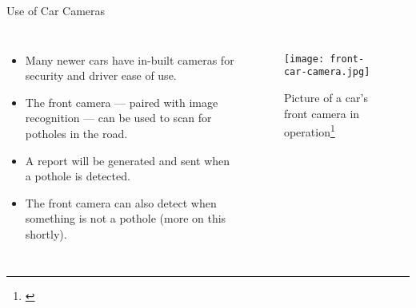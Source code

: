 \documentclass{beamer}
\begin{document}
\begin{frame}{Use of Car Cameras}
    \begin{columns}

        \begin{itemize}
            \item Many newer cars have in-built cameras for security and driver ease of use.
            \item The front camera --- paired with image recognition --- can be used to scan for potholes in the road.
            \item A report will be generated and sent when a pothole is detected.
            \item The front camera can also detect when something is \alert{not} a pothole (more on this shortly).
        \end{itemize}


        \begin{figure}
            \texttt{[image: front-car-camera.jpg]}
            \caption{Picture of a car's front camera in operation\footnote[frame]{\cite{front-camera-picture}}}
        \end{figure}
    \end{columns}
\end{frame}
\end{document}
